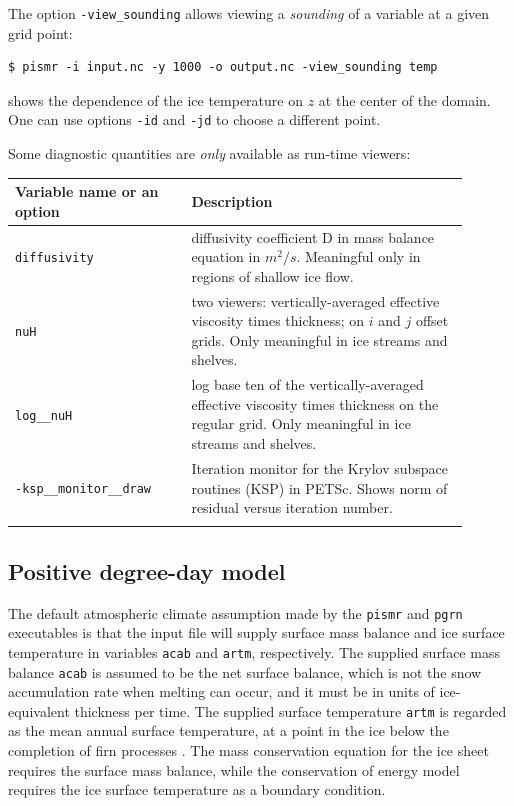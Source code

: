 \documentclass[11pt,final]{amsart}
\newcommand{\und}{\_\!\_}
\newcommand{\pismoptionindex}[1]{\index{options for PISM (and PETSc)!\texttt{-#1}}}
\newcommand{\intextoption}[1]{\texttt{-#1}\pismoptionindex{#1}}
\begin{document}
The option \verb|-view_sounding| allows viewing a \emph{sounding} of a variable at a given grid point:
\begin{verbatim}
$ pismr -i input.nc -y 1000 -o output.nc -view_sounding temp
\end{verbatim}%
shows the dependence of the ice temperature on $z$ at the center of the domain. One can use options \verb|-id| and \verb|-jd| to choose a different point.

Some diagnostic quantities are \emph{only} available as run-time viewers:
\begin{center}
  \begin{tabular}{p{0.35\linewidth}p{0.55\linewidth}}\hline
    \small
    \textbf{Variable name or an option} & \textbf{Description}\\\hline
    \texttt{diffusivity} & diﬀusivity coeﬃcient D in mass balance equation in $m^{2}/s$. Meaningful only in regions of shallow ice ﬂow.\\
    \texttt{nuH} & two viewers: vertically-averaged eﬀective viscosity times thickness; on $i$ and $j$ oﬀset grids. Only meaningful in ice streams and shelves.\\
    \texttt{log\und nuH} & log base ten of the vertically-averaged eﬀective viscosity times thickness on the regular grid. Only meaningful in ice streams and shelves.\\
    \intextoption{ksp\und monitor\und draw} & Iteration monitor for the Krylov subspace routines (KSP) in PETSc. Shows norm of residual versus iteration number.\\
    \normalsize
  \end{tabular}
\end{center}

\subsection{Positive degree-day model}  \label{subsect:pdd}     The default atmospheric climate assumption made by the \verb|pismr| and \verb|pgrn| executables is that the input file will supply surface mass balance and ice surface temperature in variables \verb|acab| and \verb|artm|, respectively.  The supplied surface mass balance \verb|acab| is assumed to be the net surface balance, which is not the snow accumulation rate when melting can occur, and it must be in units of ice-equivalent thickness per time.  The supplied surface temperature \verb|artm| is regarded as the mean annual surface temperature, at a point in the ice below the completion of firn processes \cite{Hock05}.  The mass conservation equation for the ice sheet requires the surface mass balance, while the conservation of energy model requires the ice surface temperature as a boundary condition.
\end{document}
